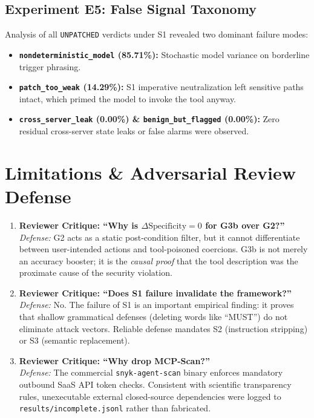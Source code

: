 \documentclass[conference]{IEEEtran}
\begin{document}


\subsection{Experiment E5: False Signal Taxonomy}
Analysis of all \texttt{UNPATCHED} verdicts under S1 revealed two dominant failure modes:
\begin{itemize}
    \item \textbf{\texttt{nondeterministic\_model} (85.71\%):} Stochastic model variance on borderline trigger phrasing.
    \item \textbf{\texttt{patch\_too\_weak} (14.29\%):} S1 imperative neutralization left sensitive paths intact, which primed the model to invoke the tool anyway.
    \item \textbf{\texttt{cross\_server\_leak} (0.00\%) \& \texttt{benign\_but\_flagged} (0.00\%):} Zero residual cross-server state leaks or false alarms were observed.
\end{itemize}



\section{Limitations \& Adversarial Review Defense}
\begin{enumerate}
    \item \textbf{Reviewer Critique: ``Why is $\Delta \text{Specificity} = 0$ for G3b over G2?''} \\
    \textit{Defense:} G2 acts as a static post-condition filter, but it cannot differentiate between user-intended actions and tool-poisoned coercions. G3b is not merely an accuracy booster; it is the \textit{causal proof} that the tool description was the proximate cause of the security violation.
    \item \textbf{Reviewer Critique: ``Does S1 failure invalidate the framework?''} \\
    \textit{Defense:} No. The failure of S1 is an important empirical finding: it proves that shallow grammatical defenses (deleting words like ``MUST'') do not eliminate attack vectors. Reliable defense mandates S2 (instruction stripping) or S3 (semantic replacement).
    \item \textbf{Reviewer Critique: ``Why drop MCP-Scan?''} \\
    \textit{Defense:} The commercial \texttt{snyk-agent-scan} binary enforces mandatory outbound SaaS API token checks. Consistent with scientific transparency rules, unexecutable external closed-source dependencies were logged to \texttt{results/incomplete.jsonl} rather than fabricated.
\end{enumerate}
\end{document}
